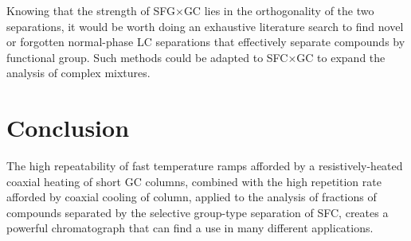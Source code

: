 Knowing that the strength of SFG×GC lies in the orthogonality of the two
separations, it would be worth doing an exhaustive literature search to find
novel or forgotten normal-phase LC separations that effectively separate
compounds by functional group. Such methods could be adapted to SFC×GC to expand
the analysis of complex mixtures.

\section{Conclusion}

The high repeatability of fast temperature ramps afforded by a
resistively-heated coaxial heating of short GC columns, combined with the high
repetition rate afforded by coaxial cooling of column, applied to the analysis
of fractions of compounds separated by the selective group-type separation of
SFC, creates a powerful chromatograph that can find a use in many different
applications.

\todos
